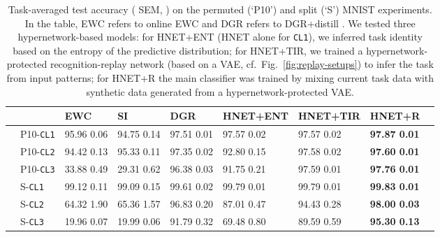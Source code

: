 \documentclass{article}
\begin{document}
\begin{table*}[ht]
 \centering
  \caption{Task-averaged test accuracy ( SEM, ) on the permuted (`P10') and split (`S') MNIST experiments. In the table, EWC refers to online EWC and DGR refers to DGR+distill \citep[results reproduced from][]{van_de_ven_three_2019}. We tested three hypernetwork-based models: for HNET+ENT (HNET alone for \texttt{CL1}), we inferred task identity based on the entropy of the predictive distribution; for HNET+TIR, we trained a hypernetwork-protected recognition-replay network (based on a VAE, cf.~Fig.~\ref{fig:replay-setups}) to infer the task from input patterns; for HNET+R the main classifier was trained by mixing current task data with synthetic data generated from a hypernetwork-protected VAE.}
  \begin{small}
  \begin{tabular}{llp{1.62cm}p{1.62cm}p{1.65cm}p{1.65cm}p{1.62cm}p{1.65cm}p{1.65cm}} \toprule
     & & \textbf{EWC}  & \textbf{SI} & \textbf{DGR}& \textbf{HNET+ENT} & \textbf{HNET+TIR} & \textbf{HNET+R}\\ \midrule \midrule
    \multirow{3}{*}{}
    & P10-\texttt{CL1} & 95.96  0.06 & 94.75   0.14 & 97.51   0.01 & 97.57   0.02 & 97.57   0.02 & \textbf{97.87   0.01}\\
        &  P10-\texttt{CL2} & 94.42   0.13 & 95.33   0.11 &97.35   0.02& 92.80   0.15 &  97.58   0.02 & \textbf{97.60   0.01}\\
    & P10-\texttt{CL3} & 33.88   0.49 & 29.31   0.62 & 96.38   0.03 & 91.75   0.21 & 97.59   0.01 & \textbf{97.76   0.01}\\
    \midrule
    \multirow{3}{*}{} 
    & S-\texttt{CL1} & 99.12   0.11 &   99.09   0.15 &  99.61   0.02 & 99.79   0.01 & 99.79   0.01 & \textbf{99.83   0.01}\\
    & S-\texttt{CL2} & 64.32   1.90 & 65.36   1.57 &  96.83   0.20 & 87.01   0.47  & 94.43   0.28 & \textbf{98.00   0.03}  \\
    & S-\texttt{CL3} & 19.96   0.07 &  19.99   0.06 &  91.79   0.32 & 69.48   0.80 & 89.59   0.59  & \textbf{95.30   0.13}\\
    \bottomrule
  \end{tabular}
  \label{tab:mnist}
  \end{small}
\end{table*}

\vspace{-2mm}
\end{document}
